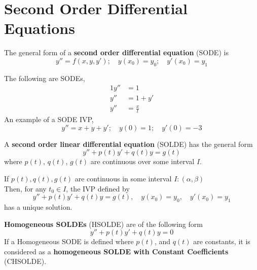 \documentclass[diffeq.tex]{subfiles}
\begin{document}
\section{Second Order Differential Equations}
\begin{definition}
    The general form of a \textbf{second order differential equation} (SODE) is
    \begin{equation}
        y'' = f(x, y, y');\quad y(x_{0}) = y_{0};\quad y'(x_{0}) = y_{1}
    \end{equation}
\end{definition}
\np
\begin{example}
    The following are SODEs,
    \begin{alignat}{1}
        y'' &= 1\\
        y'' &= 1 + y'\\
        y'' &= \frac{x}{t}
    \end{alignat}
    An example of a SODE IVP,
    \begin{equation}
        y'' = x + y + y';\quad y(0) = 1;\quad y'(0) = -3
    \end{equation}
\end{example}
\begin{definition}
    A \textbf{second order linear differential equation} (SOLDE) has the general form
    \begin{equation}
        y'' + p(t)y' + q(t)y = g(t)
    \end{equation}
    where $p(t)$, $q(t)$, $g(t)$ are continuous over some interval $I$.
\end{definition}
\begin{btheorem}
    If $p(t), q(t), g(t)$ are continuous in some interval $I: (\alpha, \beta)$\\
    Then, for any $t_{0} \in I$, the IVP defined by
    \begin{equation}
        y'' + p(t)y' + q(t)y = g(t),\quad y(x_{0}) = y_{0},\quad y'(x_{0}) = y_{1}
    \end{equation}
    has a unique solution.
\end{btheorem}
\begin{definition}
    \textbf{Homogeneous SOLDEs} (HSOLDE) are of the following form
    \begin{equation}
        y'' + p(t)y' + q(t)y = 0
    \end{equation}
    If a Homogeneous SODE is defined where $p(t)$, and $q(t)$ are constants, it is considered as a \textbf{homogeneous SOLDE with Constant Coefficients} (CHSOLDE).
\end{definition}
\np
\end{document}
